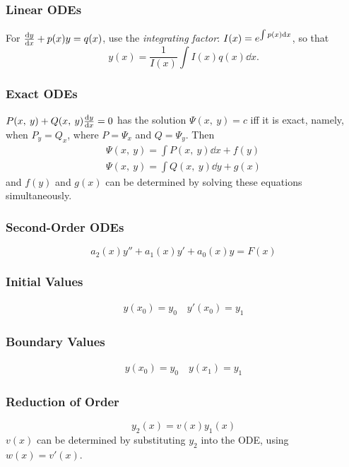 \documentclass{article}
\begin{document}
\begin{multicols}{3}
    \subsubsection*{Linear ODEs}
    For $\dv{y}{x} + p(x)y = q(x)$, use the \textit{integrating factor}:
    $I(x) = e^{\int p(x) \dd{x}}$, so that
    \begin{equation*}
        y(x) = \frac{1}{I(x)} \int I(x) q(x) \dd{x}.
    \end{equation*}
    \subsubsection*{Exact ODEs}
    $P(x,\: y) + Q(x,\: y)\dv{y}{x} = 0$
    has the solution
    $\Psi(x,\: y) = c$
    iff it is exact, namely, when
    $P_y = Q_x$,
    where $P = \Psi_x$ and $Q = \Psi_y$. Then
    \begin{gather*}
        \Psi(x,\: y) = \int P(x,\: y) \dd{x} + f(y) \\
        \Psi(x,\: y) = \int Q(x,\: y) \dd{y} + g(x)
    \end{gather*}
    and $f(y)$ and $g(x)$ can be determined by solving these equations simultaneously.
    \subsubsection*{Second-Order ODEs}
    \begin{equation*}
        a_2(x)y'' + a_1(x)y' + a_0(x)y = F(x)
    \end{equation*}
    \subsubsection*{Initial Values}
    \begin{align*}
        y(x_0) = y_0 \quad y'(x_0) = y_1
    \end{align*}
    \subsubsection*{Boundary Values}
    \begin{align*}
        y(x_0) = y_0 \quad y(x_1) = y_1
    \end{align*}
    \subsubsection*{Reduction of Order}
    \begin{equation*}
        y_2(x) = v\left(x\right) y_1(x)
    \end{equation*}
    $v(x)$ can be determined by substituting $y_2$ into the ODE, using $w(x) = v'(x)$.

\end{multicols}
\end{document}
